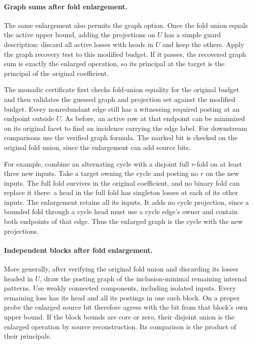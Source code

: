 \paragraph{Graph sums after fold enlargement.}
The same enlargement also permits the graph option.
Once the fold union equals the active upper bound, adding
the projections on $U$ has a simple guard description:
discard all active losses with heads in $U$ and keep the
others. Apply the graph recovery test to this modified
budget. If it passes, the recovered graph sum is exactly
the enlarged operation, so its principal at the target is
the principal of the original coefficient.

The monadic certificate first checks fold-union equality
for the original budget and then validates the guessed
graph and projection set against the modified budget.
Every nonredundant edge still has a witnessing required
posting at an endpoint outside $U$. As before, an
active row at that endpoint can be minimized on its
original facet to find an incidence carrying the edge
label. For downstream comparisons use the verified
graph formula. The marked bit is checked on the original
fold union, since the enlargement can add source bits.

For example, combine an alternating cycle with a
disjoint full $r$-fold on at least three new inputs.
Take a target owning the cycle and posting no $r$ on
the new inputs. The full fold survives in the original
coefficient, and no binary fold can replace it there:
a head in the full fold has singleton losses at each
of its other inputs. The enlargement retains all its
inputs. It adds no cycle projection, since a bounded
fold through a cycle head must use a cycle edge's
owner and contain both endpoints of that edge. Thus
the enlarged graph is the cycle with the new projections.

\paragraph{Independent blocks after fold enlargement.}
More generally, after verifying the original fold union and
discarding its losses headed in $U$, draw the posting graph
of the inclusion-minimal remaining internal patterns. Use
weakly connected components, including isolated inputs.
Every remaining loss has its head and all its postings in
one such block. On a proper probe the enlarged source bit
therefore agrees with the bit from that block's own upper
bound. If the block bounds are core or zero, their disjoint
union is the enlarged operation by source reconstruction.
Its comparison is the product of their principals.

